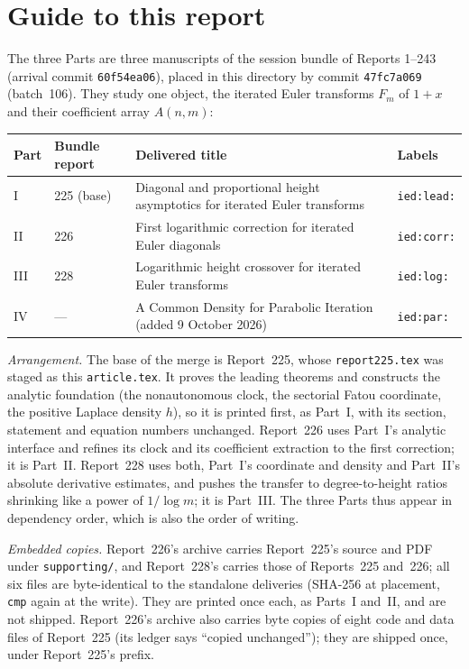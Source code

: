 \documentclass[11pt,letterpaper]{article}
\theoremstyle{remark}\newtheorem{remark}[theorem]{Remark}
\newcommand{\file}[1]{\nolinkurl{#1}}
\begin{document}
\section*{Guide to this report}\label{ied:sec:guide}
The three Parts are three manuscripts of the session bundle of Reports 1--243 (arrival commit \texttt{60f54ea06}), placed in this directory by commit \texttt{47fc7a069} (batch~106). They study one object, the iterated Euler transforms $F_m$ of $1+x$ and their coefficient array $A(n,m)$:
\begin{center}
\small
\begin{tabular}{@{}l l >{\raggedright\arraybackslash}p{} l@{}}
\toprule
Part & Bundle report & Delivered title & Labels\\
\midrule
I & 225 (base) & Diagonal and proportional height asymptotics for iterated Euler transforms & \texttt{ied:lead:}\\
II & 226 & First logarithmic correction for iterated Euler diagonals & \texttt{ied:corr:}\\
III & 228 & Logarithmic height crossover for iterated Euler transforms & \texttt{ied:log:}\\
IV & --- & A Common Density for Parabolic Iteration (added 9 October 2026) & \texttt{ied:par:}\\
\bottomrule
\end{tabular}
\end{center}
\emph{Arrangement.} The base of the merge is Report~225, whose \file{report225.tex} was staged as this \file{article.tex}. It proves the leading theorems and constructs the analytic foundation (the nonautonomous clock, the sectorial Fatou coordinate, the positive Laplace density $h$), so it is printed first, as Part~I, with its section, statement and equation numbers unchanged. Report~226 uses Part~I's analytic interface and refines its clock and its coefficient extraction to the first correction; it is Part~II. Report~228 uses both, Part~I's coordinate and density and Part~II's absolute derivative estimates, and pushes the transfer to degree-to-height ratios shrinking like a power of $1/\log m$; it is Part~III. The three Parts thus appear in dependency order, which is also the order of writing.

\emph{Embedded copies.} Report~226's archive carries Report~225's source and PDF under \file{supporting/}, and Report~228's carries those of Reports~225 and~226; all six files are byte-identical to the standalone deliveries (SHA-256 at placement, \texttt{cmp} again at the write). They are printed once each, as Parts~I and~II, and are not shipped. Report~226's archive also carries byte copies of eight code and data files of Report~225 (its ledger says ``copied unchanged''); they are shipped once, under Report~225's prefix.
\end{document}
